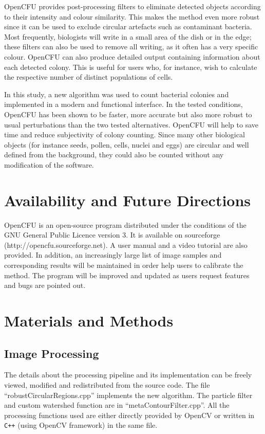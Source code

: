 \documentclass[10pt]{article}
\newcommand{\website}{http://opencfu.sourceforge.net}
\begin{document}
OpenCFU provides post-processing filters to eliminate detected
objects according to their intensity and colour similarity. This makes the method
even more robust since it can be used to exclude circular artefacts such as
contaminant bacteria. Most frequently, biologists will write in a small area of
the dish or in the edge; these filters can also be used to remove all writing, as it often has a very specific colour.
OpenCFU can also produce detailed output containing information about each detected
colony. This is useful for users who, for instance, wish to calculate the
respective number of distinct populations of cells.

In this study, a new algorithm was used to count bacterial colonies and
implemented in a modern and functional interface. In the tested conditions,
OpenCFU has been shown to be faster, more accurate but
also more robust to usual perturbations than the two tested alternatives.
OpenCFU will help to save time and reduce subjectivity of colony
counting. Since many other biological objects (for instance seeds, pollen, cells,
nuclei and eggs) are circular and well defined from the background, they could
also be counted without any modification of the software.

\section*{Availability and Future Directions}
OpenCFU is an open-source program distributed under the conditions of the GNU
General Public Licence version 3. It is available on sourceforge (\website{}). A
user manual and a video tutorial are also provided. In addition, an increasingly large list
of image samples and corresponding results will be maintained in order help users to calibrate the method. The program will be improved
and updated as users request features and bugs are pointed out.

\section*{Materials and Methods} 

\subsection*{Image Processing} The details
about the processing pipeline and its implementation can be freely viewed,
modified and redistributed from the source code. The file
``robustCircularRegions.cpp'' implements the new algorithm. The particle filter
and custom watershed function are in ``metaContourFilter.cpp''.
All the processing functions used are either directly provided by OpenCV or
written in \texttt{C++} (using OpenCV framework) in the same file.
\end{document}
